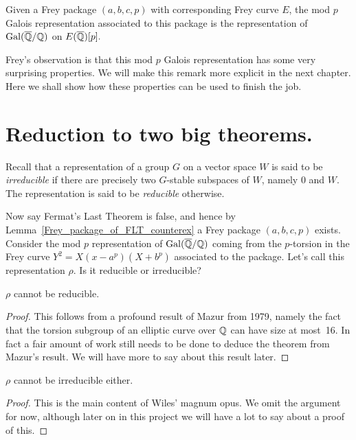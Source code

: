 \begin{definition}\label{Frey_mod_p_Galois_representation} Given a Frey package $(a,b,c,p)$ with corresponding Frey curve $E$, the mod $p$ Galois representation associated to this package is the representation of $\operatorname{Gal}(\overline{\mathbb{Q}}/\mathbb{Q})$ on $E(\overline{\mathbb{Q}})[p].$\end{definition}

Frey's observation is that this mod $p$ Galois representation has some very surprising properties. We will make this remark more explicit in the next chapter. Here we shall show how these properties can be used to finish the job.

\section{Reduction to two big theorems.}
  
Recall that a representation of a group $G$ on a vector space $W$ is said to be \emph{irreducible} if there are precisely two $G$-stable subspaces of $W$, namely $0$ and $W$. The representation is said to be \emph{reducible} otherwise.

Now say Fermat's Last Theorem is false, and hence by Lemma~\ref{Frey_package_of_FLT_counterex} a Frey package $(a,b,c,p)$ exists.  Consider the mod $p$ representation of $\operatorname{Gal}(\overline{\mathbb{Q}}/\mathbb{Q})$ coming from the $p$-torsion in the Frey curve $Y^2=X(x-a^p)(X+b^p)$ associated to the package. Let's call this representation $\rho$. Is it reducible or irreducible?

\begin{theorem}[Mazur]\label{Mazur_on_Frey_curve}\leanok $\rho$ cannot be reducible.\end{theorem}
\begin{proof}\tangled This follows from a profound result of Mazur \cite{mazur} from 1979, namely the fact that the torsion subgroup of an elliptic curve over $\mathbb{Q}$ can have size at most~16. In fact a fair amount of work still needs to be done to deduce the theorem from Mazur's result. We will have more to say about this result later.
\end{proof}

\begin{theorem}\label{Wiles_on_Frey_curve}\leanok $\rho$ cannot be irreducible either.\end{theorem}
\begin{proof}\tangled This is the main content of Wiles' magnum opus. We omit the argument for now, although later on in this project we will have a lot to say about a proof of this.
\end{proof}


